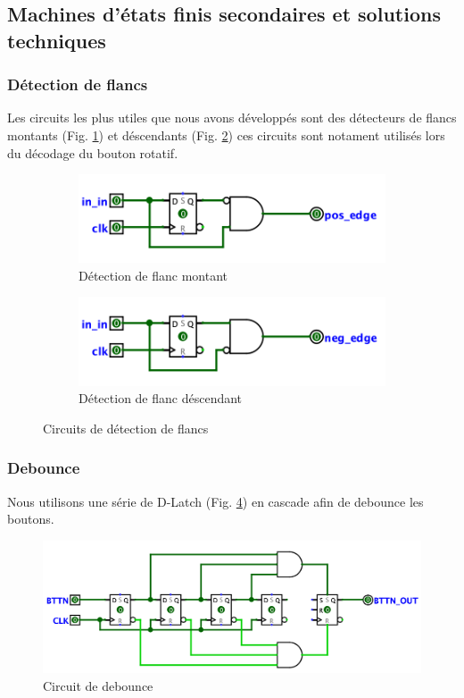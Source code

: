 \documentclass[a4paper, 11pt]{article}
\begin{document}
\subsection{Machines d'états finis secondaires et solutions techniques}
\subsubsection{Détection de flancs}
Les circuits les plus utiles que nous avons développés sont des détecteurs de flancs montants (Fig. \ref{fig:risingEdge}) et déscendants (Fig. \ref{fig:fallingEdge}) ces circuits sont notament utilisés lors du décodage du bouton rotatif.



\begin{figure}[h]
\centering
\begin{subfigure}{.5\textwidth}
  \centering
  \includegraphics[width=.7\linewidth]{figures/risingEdge.png}
  \caption{Détection de flanc montant}
  \label{fig:risingEdge}
\end{subfigure}%
\begin{subfigure}{.5\textwidth}
  \centering
  \includegraphics[width=.7\linewidth]{figures/fallingEdge.png}
  \caption{Détection de flanc déscendant}
  \label{fig:fallingEdge}
\end{subfigure}
\caption{Circuits de détection de flancs}
\label{fig:edge}
\end{figure}

\subsubsection{Debounce}
Nous utilisons une série de D-Latch (Fig. \ref{fig:debounce}) en cascade afin de debounce les boutons.

\begin{figure}[!h]
\centering
\includegraphics[scale=0.4]{figures/debounce.png}
\caption{Circuit de debounce}
\label{fig:debounce}
\end{figure}
\newpage
\end{document}
